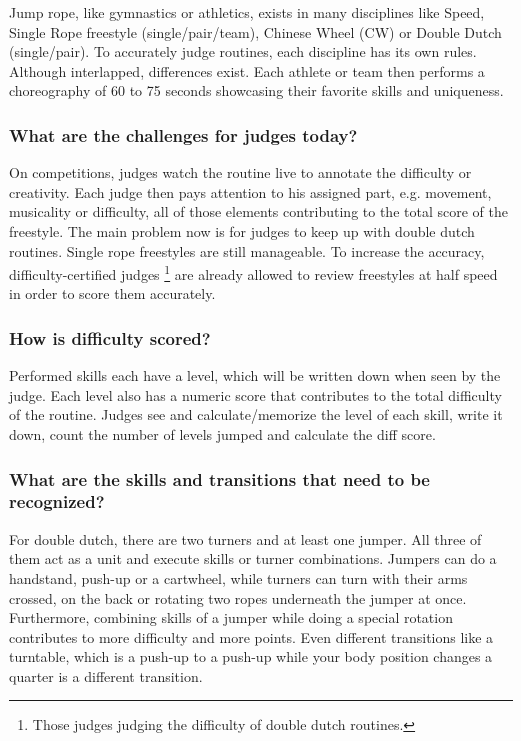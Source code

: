 Jump rope, like gymnastics or athletics, exists in many disciplines like Speed, Single Rope freestyle (single/pair/team), Chinese Wheel (CW) or Double Dutch (single/pair).
To accurately judge routines, each discipline has its own rules. Although interlapped, differences exist. Each athlete or team then performs a choreography of 60 to 75 seconds showcasing their favorite skills and uniqueness.

\subsubsection{What are the challenges for judges today?}
\label{proposal-subsubsec:proposal-intro-question-challenges-for-judges}

On competitions, judges watch the routine live to annotate the difficulty or creativity. Each judge then pays attention to his assigned part, e.g. movement, musicality or difficulty, all of those elements contributing to the total score of the freestyle. The main problem now is for judges to keep up with double dutch routines. Single rope freestyles are still manageable. To increase the accuracy, difficulty-certified judges \footnote{Those judges judging the difficulty of double dutch routines.} are already allowed to review freestyles at half speed in order to score them accurately.

\subsubsection{How is difficulty scored?}
\label{proposal-subsubsec:proposal-intro-question-difficulty-scored}

Performed skills each have a level, which will be written down when seen by the judge. Each level also has a numeric score that contributes to the total difficulty of the routine. Judges see and calculate/memorize the level of each skill, write it down, count the number of levels jumped and calculate the diff score.

\subsubsection{What are the skills and transitions that need to be recognized?}
\label{proposal-subsubsec:proposal-intro-question-what-are-the-skill}

For double dutch, there are two turners and at least one jumper. All three of them act as a unit and execute skills or turner combinations. Jumpers can do a handstand, push-up or a cartwheel, while turners can turn with their arms crossed, on the back or rotating two ropes underneath the jumper at once. Furthermore, combining skills of a jumper while doing a special rotation contributes to more difficulty and more points. Even different transitions like a turntable, which is a push-up to a push-up while your body position changes a quarter is a different transition.


